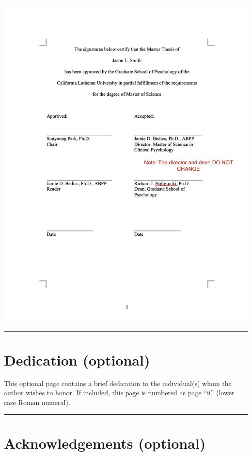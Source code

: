 \documentclass[openany]{book}
\begin{document}
\includegraphics{images/signaturepage.png}

\begin{center}\rule{0.5\linewidth}{0.5pt}\end{center}

\hypertarget{dedication-optional}{%
\section{Dedication (optional)}\label{dedication-optional}}

This optional page contains a brief dedication to the individual(s) whom the author wishes to honor. If included, this page is numbered as page ``ii'' (lower case Roman numeral).

\begin{center}\rule{0.5\linewidth}{0.5pt}\end{center}

\hypertarget{acknowledgements-optional}{%
\section{Acknowledgements (optional)}\label{acknowledgements-optional}}
\end{document}
